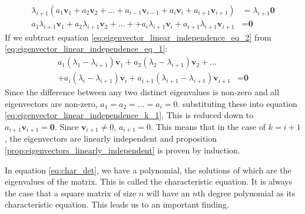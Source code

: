 \documentclass[a4paper,12pt]{book}
\newcommand{\vectr}[1]{\textbf{#1}}
\begin{document}
	\begin{align}
		\lambda_{i + 1}(a_1 \vectr{v}_1 + a_2 \vectr{v}_2 + \ldots + a_{i - 1} \vectr{v}_{i - 1} + a_i \vectr{v}_i + a_{i + 1} \vectr{v}_{i + 1}) &= \lambda_{i + 1}\vectr{0} \nonumber \\
		\label{eq:eigenvector_linear_independence_eq_2} a_1\lambda_{i + 1} \vectr{v}_1 + a_2\lambda_{i + 1} \vectr{v}_2 + \ldots +  + a_i\lambda_{i + 1} \vectr{v}_i + a_{i + 1}\lambda_{i + 1} \vectr{v}_{i + 1} &= \vectr{0}
	\end{align}
	If we subtract equation \ref{eq:eigenvector_linear_independence_eq_2} from \ref{eq:eigenvector_linear_independence_eq_1}:
	\begin{align}
		a_1 (\lambda_1 - \lambda_{i + 1}) \vectr{v}_1 + a_2 (\lambda_2 - \lambda_{i + 1}) \vectr{v}_2 + \ldots \nonumber \\+ a_i (\lambda_i - \lambda_{i + 1}) \vectr{v}_i + a_{i + 1} (\lambda_{i + 1} - \lambda_{i + 1}) \vectr{v}_{i + 1} &= \vectr{0} 
	\end{align}
	Since the difference between any two distinct eigenvalues is non-zero and all eigenvectors are non-zero, $ a_1 = a_2 = \ldots = a_i = 0 $. substituting these into equation \ref{eq:eigenvector_linear_independence_k_1}, This is reduced down to $ a_{i + 1}\vectr{v}_{i + 1} = \vectr{0}$. Since $ \vectr{v}_{i + 1} \ne 0 $,  $ a_{i + 1} = 0 $. This means that in the case of $ k = i + 1 $, the eigenvectors are linearly independent and proposition \ref{prop:eigenvectors_linearly_independent} is proven by induction.
	
	In equation \ref{eq:char_det}, we have a polynomial, the solutions of which are the eigenvalues of the matrix. This is called the characteristic equation. It is always the case that a square matrix of size $ n $ will have an $ n $th degree polynomial as its characteristic equation. This leads us to an important finding.
	
\end{document}
